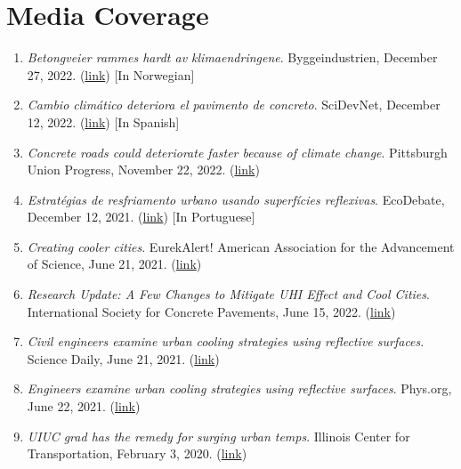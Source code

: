 \documentclass[12pt]{article}
\begin{document}
\section*{Media Coverage}
\hfill
\begin{enumerate}[label=(M\arabic*)]
	\item \textit{Betongveier rammes hardt av klimaendringene}. Byggeindustrien, December 27, 2022. (\href{https://www.bygg.no/betongveier-rammes-hardt-av-klimaendringene/1514889!/}{link}) [In Norwegian]
	\item \textit{Cambio climático deteriora el pavimento de concreto}. SciDevNet, December 12, 2022. (\href{https://www.scidev.net/america-latina/news/cambio-climatico-deteriora-el-pavimento-de-concreto//}{link}) [In Spanish]
	\item \textit{Concrete roads could deteriorate faster because of climate change}. Pittsburgh Union Progress, November 22, 2022. (\href{https://www.unionprogress.com/2022/11/22/concrete-roads-could-deteriorate-faster-because-of-climate-change/}{link})
	\item \textit{Estratégias de resfriamento urbano usando superfícies reflexivas}. EcoDebate, December 12, 2021. (\href{https://www.ecodebate.com.br/2021/06/21/estrategias-de-resfriamento-urbano-usando-superficies-reflexivas/}{link}) [In Portuguese]
	\item \textit{Creating cooler cities}. EurekAlert! American Association for the Advancement of Science, June 21, 2021. (\href{https://www.eurekalert.org/news-releases/536867}{link})
	\item \textit{Research Update: A Few Changes to Mitigate UHI Effect and Cool Cities}. International Society for Concrete Pavements, June 15, 2022. (\href{https://www.concretepavements.org/2021/06/15/18878/}{link})
	\item \textit{Civil engineers examine urban cooling strategies using reflective surfaces}. Science Daily, June 21, 2021. (\href{https://www.sciencedaily.com/releases/2021/06/210621174101.htm}{link})
	\item \textit{Engineers examine urban cooling strategies using reflective surfaces}. Phys.org, June 22, 2021. (\href{https://phys.org/news/2021-06-urban-cooling-strategies-surfaces.html/}{link})
	\item \textit{UIUC grad has the remedy for surging urban temps}. Illinois Center for Transportation, February 3, 2020. (\href{https://ict.illinois.edu/news/newsletters/more-newsletters/february-2020/uiuc-grad-has-the-treatment-for-surging-urban-temps}{link})

\end{enumerate}
\end{document}
